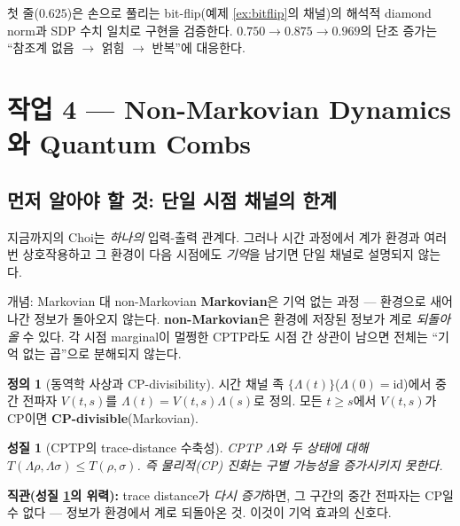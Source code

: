 \documentclass[11pt,a4paper]{article}
\newcommand{\id}{\mathrm{id}}
\theoremstyle{definition}
\newtheorem{definition}{정의}[section]
\theoremstyle{plain}
\newtheorem{property}{성질}[section]
\theoremstyle{remark}
\begin{document}
첫 줄($0.625$)은 손으로 풀리는 bit-flip(예제 \ref{ex:bitflip}의 채널)의 해석적 diamond norm과 SDP 수치 일치로 구현을 검증한다. $0.750\to0.875\to0.969$의 단조 증가는 ``참조계 없음 $\to$ 얽힘 $\to$ 반복''에 대응한다.

\section{작업 4 --- Non-Markovian Dynamics와 Quantum Combs}

\subsection{먼저 알아야 할 것: 단일 시점 채널의 한계}

지금까지의 Choi는 \emph{하나의} 입력-출력 관계다. 그러나 시간 과정에서 계가 환경과 여러 번 상호작용하고 그 환경이 다음 시점에도 \emph{기억}을 남기면 단일 채널로 설명되지 않는다.

\begin{conceptbox}{개념: Markovian 대 non-Markovian}
\textbf{Markovian}은 기억 없는 과정 --- 환경으로 새어 나간 정보가 돌아오지 않는다. \textbf{non-Markovian}은 환경에 저장된 정보가 계로 \emph{되돌아올} 수 있다. 각 시점 marginal이 멀쩡한 CPTP라도 시점 간 상관이 남으면 전체는 ``기억 없는 곱''으로 분해되지 않는다.
\end{conceptbox}

\begin{definition}[동역학 사상과 CP-divisibility]
시간 채널 족 $\{\Lambda(t)\}$($\Lambda(0)=\id$)에서 중간 전파자 $V(t,s)$를 $\Lambda(t)=V(t,s)\Lambda(s)$로 정의. 모든 $t\ge s$에서 $V(t,s)$가 CP이면 \textbf{CP-divisible}(Markovian).
\end{definition}

\begin{property}[CPTP의 trace-distance 수축성]\label{prop:contract}
CPTP $\Lambda$와 두 상태에 대해 $T(\Lambda\rho,\Lambda\sigma)\le T(\rho,\sigma)$. 즉 물리적(CP) 진화는 구별 가능성을 증가시키지 못한다.
\end{property}

\begin{intuitionbox}
\textbf{직관(성질 \ref{prop:contract}의 위력):} trace distance가 \emph{다시 증가}하면, 그 구간의 중간 전파자는 CP일 수 없다 --- 정보가 환경에서 계로 되돌아온 것. 이것이 기억 효과의 신호다.
\end{intuitionbox}
\end{document}
